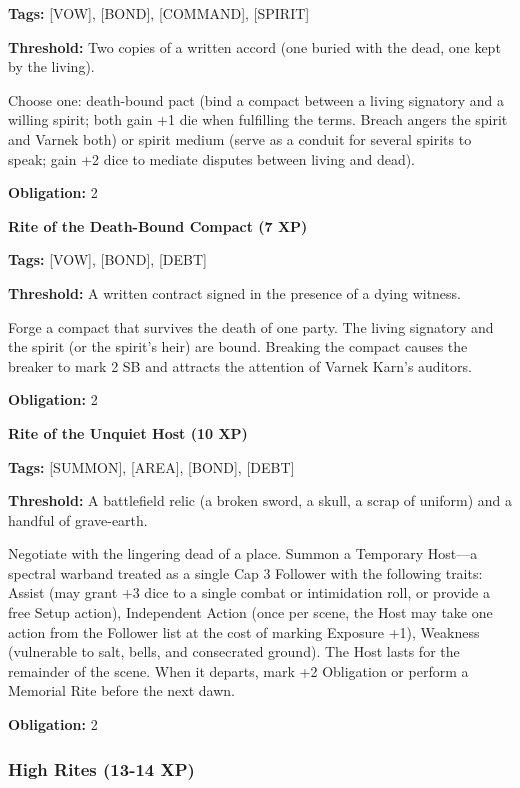 \textbf{Tags:} [VOW], [BOND], [COMMAND], [SPIRIT]

\textbf{Threshold:} Two copies of a written accord (one buried with the dead, one kept by the living).

Choose one: death-bound pact (bind a compact between a living signatory and a willing spirit; both gain +1 die when fulfilling the terms. Breach angers the spirit and Varnek both) or spirit medium (serve as a conduit for several spirits to speak; gain +2 dice to mediate disputes between living and dead).

\textbf{Obligation:} 2

\vspace{0.5em}

\textbf{Rite of the Death-Bound Compact (7 XP)}

\textbf{Tags:} [VOW], [BOND], [DEBT]

\textbf{Threshold:} A written contract signed in the presence of a dying witness.

Forge a compact that survives the death of one party. The living signatory and the spirit (or the spirit's heir) are bound. Breaking the compact causes the breaker to mark 2 SB and attracts the attention of Varnek Karn's auditors.

\textbf{Obligation:} 2

\vspace{0.5em}

\textbf{Rite of the Unquiet Host (10 XP)}

\textbf{Tags:} [SUMMON], [AREA], [BOND], [DEBT]

\textbf{Threshold:} A battlefield relic (a broken sword, a skull, a scrap of uniform) and a handful of grave-earth.

Negotiate with the lingering dead of a place. Summon a Temporary Host—a spectral warband treated as a single Cap 3 Follower with the following traits: Assist (may grant +3 dice to a single combat or intimidation roll, or provide a free Setup action), Independent Action (once per scene, the Host may take one action from the Follower list at the cost of marking Exposure +1), Weakness (vulnerable to salt, bells, and consecrated ground). The Host lasts for the remainder of the scene. When it departs, mark +2 Obligation or perform a Memorial Rite before the next dawn.

\textbf{Obligation:} 2

\subsubsection{High Rites (13-14 XP)}

